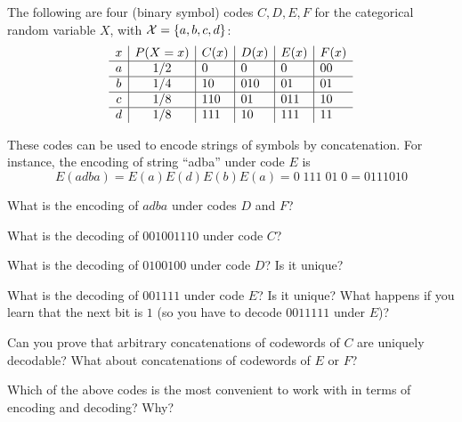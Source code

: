 \documentclass[10pt, a5paper]{scrartcl}
\begin{document}
\begin{exercise}[Codes]
  The following are four (binary symbol) codes $C,D,E, F$ for the categorical
  random variable $X$, with ${\cal X} = \{a,b,c,d\}$:
  \[
    \begin{array}{c | c | l | l | l | l}
    x & P(X=x) & C(x) & D(x) & E(x) & F(x)\\
    \hline
    a & 1/2 & 0   & 0   & 0   & 00 \\
    \hline
    b & 1/4 & 10  & 010 & 01  & 01\\
    \hline
    c & 1/8 & 110 & 01  & 011 & 10 \\
    \hline
    d & 1/8 & 111 & 10  & 111 & 11 \\
    \end{array}
  \]

  These codes can be used to encode strings of symbols by concatenation. For
  instance, the encoding of string ``adba'' under code $E$ is
  \[
    E(adba) 
      = E(a) E(d) E(b) E(a) 
      = 0 \; 111 \; 01 \; 0 
      = 0111010
  \]
  
  \begin{subex}
    What is the encoding of $adba$ under codes $D$ and $F$?	
  \end{subex}

  \begin{subex}
    What is the decoding of $001001110$ under code $C$?
  \end{subex}
  
  \begin{subex}
    What is the decoding of $0100100$ under code $D$? Is it unique?
  \end{subex}
  
  \begin{subex}
    What is the decoding of $001111$ under code $E$? Is it unique? What happens
    if you learn that the next bit is $1$ (so you have to decode $0011111$
    under $E$)?
  \end{subex}

  \begin{subex}
    Can you prove that arbitrary concatenations of codewords of $C$ are
    uniquely decodable? What about concatenations of codewords of $E$ or $F$?
  \end{subex}

  \begin{subex}
    Which of the above codes is the most convenient to work with in terms of
    encoding and decoding? Why?
  \end{subex}
\end{exercise}
\end{document}
